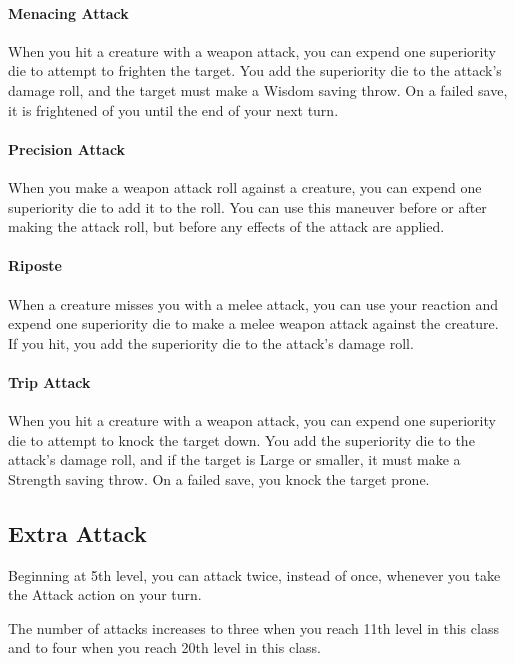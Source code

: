 {\paragraph*{Menacing Attack}
When you hit a creature with a weapon attack, you can expend one superiority die to attempt to frighten the target. You add the superiority die to the attack's damage roll, and the target must make a Wisdom saving throw. On a failed save, it is frightened of you until the end of your next turn.
\paragraph*{Precision Attack}
When you make a weapon attack roll against a creature, you can expend one superiority die to add it to the roll. You can use this maneuver before or after making the attack roll, but before any effects of the attack are applied.
\paragraph*{Riposte}
When a creature misses you with a melee attack, you can use your reaction and expend one superiority die to make a melee weapon attack against the creature. If you hit, you add the superiority die to the attack's damage roll.
\paragraph*{Trip Attack}
When you hit a creature with a weapon attack, you can expend one superiority die to attempt to knock the target down. You add the superiority die to the attack's damage roll, and if the target is Large or smaller, it must make a Strength saving throw. On a failed save, you knock the target prone.
\subsection*{Extra Attack}
Beginning at 5th level, you can attack twice, instead of once, whenever you take the Attack action on your turn.

The number of attacks increases to three when you reach 11th level in this class and to four when you reach 20th level in this class.
}